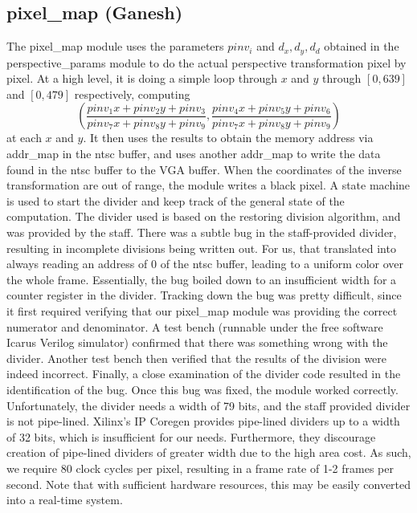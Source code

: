 \documentclass{article}
\begin{document}
\subsection{pixel\_map (Ganesh)}
The pixel\_map module uses the parameters $pinv_i$ and $d_x, d_y, d_d$ obtained in the perspective\_params module to do the actual perspective transformation pixel by pixel.
At a high level, it is doing a simple loop through $x$ and $y$ through $[0, 639]$ and $[0, 479]$ respectively, computing
\begin{equation*}
    \left( \frac{pinv_1 x + pinv_2 y + pinv_3}{pinv_7 x + pinv_8 y + pinv_9}, \frac{pinv_4 x + pinv_5 y + pinv_6}{pinv_7 x + pinv_8 y + pinv_9} \right)
\end{equation*}
at each $x$ and $y$.
It then uses the results to obtain the memory address via addr\_map in the ntsc buffer,
and uses another addr\_map to write the data found in the ntsc buffer to the VGA buffer.
When the coordinates of the inverse transformation are out of range,
the module writes a black pixel.
A state machine is used to start the divider and keep track of the general state of the computation.
The divider used is based on the restoring division algorithm,
and was provided by the staff.
There was a subtle bug in the staff-provided divider, resulting in incomplete divisions being written out.
For us, that translated into always reading an address of $0$ of the ntsc buffer,
leading to a uniform color over the whole frame.
Essentially, the bug boiled down to an insufficient width for a counter register in the divider.
Tracking down the bug was pretty difficult,
since it first required verifying that our pixel\_map module was providing the correct numerator and denominator.
A test bench (runnable under the free software Icarus Verilog simulator) confirmed that there was something wrong with the divider.
Another test bench then verified that the results of the division were indeed incorrect.
Finally, a close examination of the divider code resulted in the identification of the bug.
Once this bug was fixed, the module worked correctly.
Unfortunately, the divider needs a width of 79 bits, and the staff provided divider is not pipe-lined.
Xilinx's IP Coregen provides pipe-lined dividers up to a width of 32 bits, which is insufficient for our needs.
Furthermore, they discourage creation of pipe-lined dividers of greater width due to the high area cost.
As such, we require 80 clock cycles per pixel, resulting in a frame rate of 1-2 frames per second.
Note that with sufficient hardware resources, this may be easily converted into a real-time system.
\end{document}
